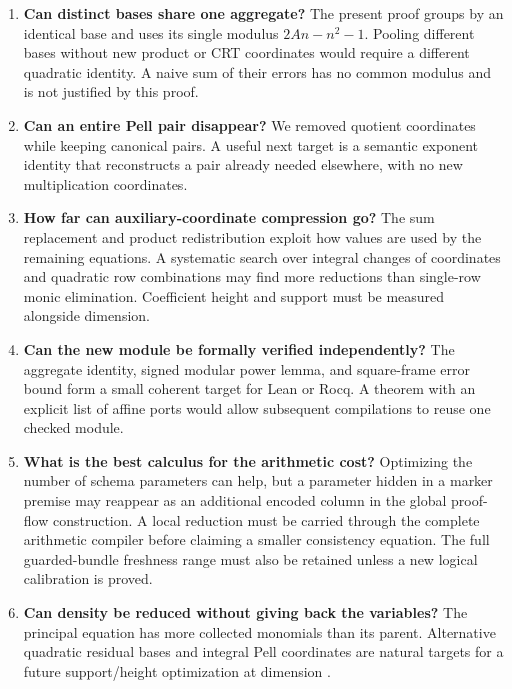 \documentclass[11pt,letterpaper]{article}
\theoremstyle{definition}\newtheorem{definition}[theorem]{Definition}
\theoremstyle{remark}\newtheorem{remark}[theorem]{Remark}
\begin{document}
\begin{enumerate}
\item \textbf{Can distinct bases share one aggregate?}
The present proof groups by an identical base and uses its single modulus
\(2An-n^2-1\). Pooling different bases without new product or CRT
coordinates would require a different quadratic identity. A naive sum
of their errors has no common modulus and is not justified by this proof.
\item \textbf{Can an entire Pell pair disappear?}
We removed quotient coordinates while keeping canonical pairs. A useful
next target is a semantic exponent identity that reconstructs a pair
already needed elsewhere, with no new multiplication coordinates.
\item \textbf{How far can auxiliary-coordinate compression go?}
The sum replacement and product redistribution exploit how values are
used by the remaining equations. A systematic search over integral
changes of coordinates and quadratic row combinations may find more
reductions than single-row monic elimination. Coefficient height and
support must be measured alongside dimension.
\item \textbf{Can the new module be formally verified independently?}
The aggregate identity, signed modular power lemma, and square-frame
error bound form a small coherent target for Lean or Rocq. A theorem
with an explicit list of affine ports would allow subsequent compilations
to reuse one checked module.
\item \textbf{What is the best calculus for the arithmetic cost?}
Optimizing the number of schema parameters can help, but a parameter
hidden in a marker premise may reappear as an additional encoded column
in the global proof-flow construction. A local reduction must be carried
through the complete arithmetic compiler before claiming a smaller
consistency equation. The full guarded-bundle freshness range must also
be retained unless a new logical calibration is proved.
\item \textbf{Can density be reduced without giving back the variables?}
The principal equation has more collected monomials than its parent.
Alternative quadratic residual bases and integral Pell coordinates are
natural targets for a future support/height optimization at dimension
\NumVars.
\end{enumerate}
\end{document}
